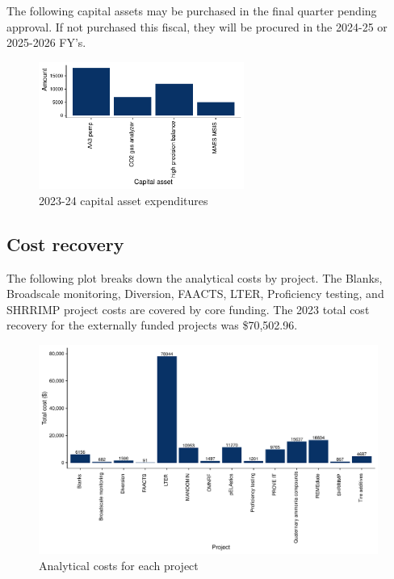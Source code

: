 \documentclass[
]{article}
\begin{document}
The following capital assets may be purchased in the final quarter
pending approval. If not purchased this fiscal, they will be procured in
the 2024-25 or 2025-2026 FY's.

\begin{figure}[h]
\centering
  \includegraphics[width=0.6\textwidth]{2023_24FY_capital_assets.pdf}
  \caption{2023-24 capital asset expenditures}
\end{figure}
\pagebreak

\hypertarget{cost-recovery}{%
\subsection{Cost recovery}\label{cost-recovery}}

The following plot breaks down the analytical costs by project. The
Blanks, Broadscale monitoring, Diversion, FAACTS, LTER, Proficiency
testing, and SHRRIMP project costs are covered by core funding. The 2023
total cost recovery for the externally funded projects was \$70,502.96.

\begin{figure}[h]
\centering
  \includegraphics[width=0.99\textwidth]{costs_summary_plot.pdf}
  \caption{Analytical costs for each project}
\end{figure}
\end{document}
